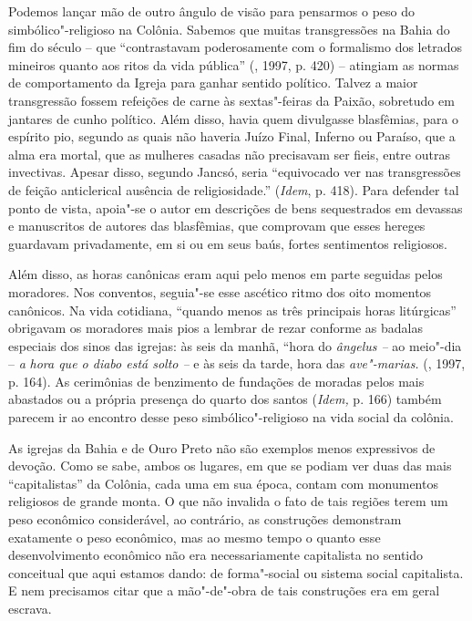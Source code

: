Podemos lançar mão de outro ângulo de visão para pensarmos o peso do
simbólico"-religioso na Colônia. Sabemos que muitas transgressões na
Bahia do fim do século  -- que ``contrastavam poderosamente com o
formalismo dos letrados mineiros quanto aos ritos da vida pública''
(, 1997, p. 420) -- atingiam as normas de comportamento da Igreja
para ganhar sentido político. Talvez a maior transgressão fossem
refeições de carne às sextas"-feiras da Paixão, sobretudo em jantares de
cunho político. Além disso, havia quem divulgasse blasfêmias, para o
espírito pio, segundo as quais não haveria Juízo Final, Inferno ou
Paraíso, que a alma era mortal, que as mulheres casadas não precisavam
ser fieis, entre outras invectivas. Apesar disso, segundo Jancsó, seria
``equivocado ver nas transgressões de feição anticlerical ausência de
religiosidade.'' (\emph{Idem}, p. 418). Para defender tal ponto de
vista, apoia"-se o autor em descrições de bens sequestrados em devassas e
manuscritos de autores das blasfêmias, que comprovam que esses hereges
guardavam privadamente, em si ou em seus baús, fortes sentimentos
religiosos.

Além disso, as horas canônicas eram aqui pelo menos em parte seguidas
pelos moradores. Nos conventos, seguia"-se esse ascético ritmo dos oito
momentos canônicos. Na vida cotidiana, ``quando menos as três principais
horas litúrgicas'' obrigavam os moradores mais pios a lembrar de rezar
conforme as badalas especiais dos sinos das igrejas: às seis da manhã,
``hora do \emph{ângelus --} ao meio"-dia -- \emph{a} \emph{hora que o
diabo está solto --} e às seis da tarde, hora das \emph{ave"-marias.}
(, 1997, p. 164). As cerimônias de benzimento de fundações de
moradas pelos mais abastados ou a própria presença do quarto dos santos
(\emph{Idem,} p. 166) também parecem ir ao encontro desse peso
simbólico"-religioso na vida social da colônia.

As igrejas da Bahia e de Ouro Preto não são exemplos menos expressivos
de devoção. Como se sabe, ambos os lugares, em que se podiam ver duas
das mais ``capitalistas'' da Colônia, cada uma em sua época, contam com
monumentos religiosos de grande monta. O que não invalida o fato de tais
regiões terem um peso econômico considerável, ao contrário, as
construções demonstram exatamente o peso econômico, mas ao mesmo tempo o
quanto esse desenvolvimento econômico não era necessariamente
capitalista no sentido conceitual que aqui estamos dando: de
forma"-social ou sistema social capitalista. E nem precisamos citar que a
mão"-de"-obra de tais construções era em geral escrava.

